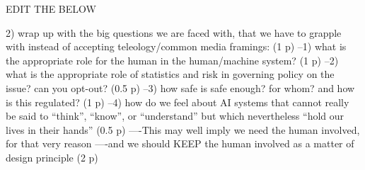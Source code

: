 EDIT THE BELOW

2) wrap up with the big questions we are faced with, that we have to
grapple with instead of accepting teleology/common media framings: (1
p)
--1) what is the appropriate role for the human in the human/machine
system? (1 p)
--2) what is the appropriate role of statistics and risk in governing
policy on the issue? can you opt-out? (0.5 p)
--3) how safe is safe enough? for whom? and how is this regulated? (1
p)
--4) how do we feel about AI systems that cannot really be said to
``think'', ``know'', or ``understand'' but which nevertheless ``hold
our lives in their hands'' (0.5 p)
----This may well imply we need the human involved, for that very
reason
----and we should KEEP the human involved as a matter of design
principle (2 p)

